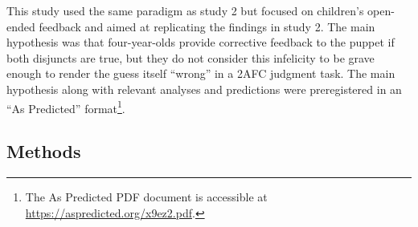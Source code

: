 \documentclass[floatsintext,man]{apa6}
\theoremstyle{definition}
\theoremstyle{definition}
\theoremstyle{definition}
\theoremstyle{remark}
\begin{document}
This study used the same paradigm as study 2 but focused on children's
open-ended feedback and aimed at replicating the findings in study 2.
The main hypothesis was that four-year-olds provide corrective feedback
to the puppet if both disjuncts are true, but they do not consider this
infelicity to be grave enough to render the guess itself \enquote{wrong}
in a 2AFC judgment task. The main hypothesis along with relevant
analyses and predictions were preregistered in an \enquote{As Predicted}
format\footnote{The As Predicted PDF document is accessible at
  \url{https://aspredicted.org/x9ez2.pdf}.}.

\subsection{Methods}\label{methods-2}
\end{document}
